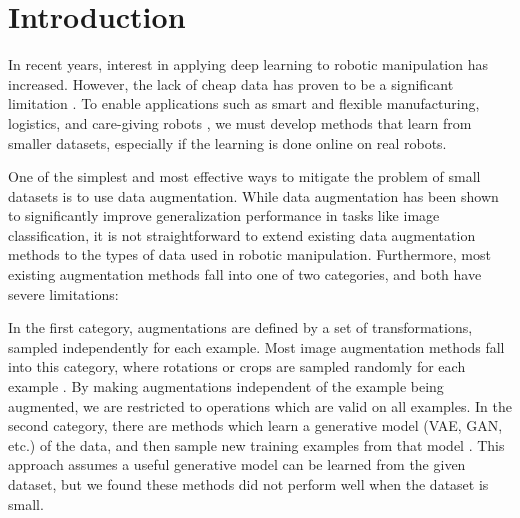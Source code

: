 \section{Introduction} \label{RSS:sec:introduction}

In recent years, interest in applying deep learning to robotic manipulation has increased. However, the lack of cheap data has proven to be a significant limitation \cite{DisbandOpenAI2021}. To enable applications such as smart and flexible manufacturing, logistics, and care-giving robots \cite{WEFRobots}, we must develop methods that learn from smaller datasets, especially if the learning is done online on real robots.

One of the simplest and most effective ways to mitigate the problem of small datasets is to use data augmentation. While data augmentation has been shown to significantly improve generalization performance in tasks like image classification, it is not straightforward to extend existing data augmentation methods to the types of data used in robotic manipulation. Furthermore, most existing augmentation methods fall into one of two categories, and both have severe limitations:

In the first category, augmentations are defined by a set of transformations, sampled independently for each example. Most image augmentation methods fall into this category, where rotations or crops are sampled randomly for each example \cite{Augerino2020,AutoAugment,BestPractice2003}. By making augmentations independent of the example being augmented, we are restricted to operations which are valid on all examples. In the second category, there are methods which learn a generative model (VAE, GAN, etc.) of the data, and then sample new training examples from that model \cite{BayesianDATran2017,MaterialsAEOhno2020,PriceForecastingAE2021}. This approach assumes a useful generative model can be learned from the given dataset, but we found these methods did not perform well when the dataset is small.

